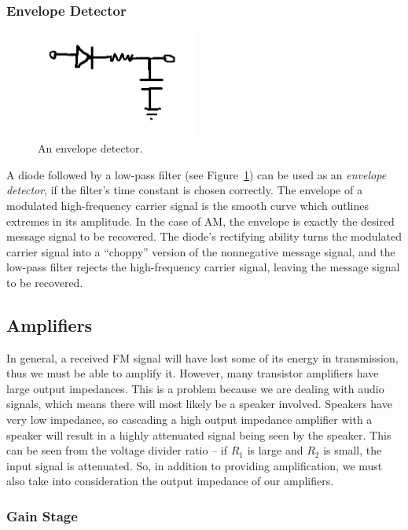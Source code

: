 \documentclass[11pt]{article}
\begin{document}
        \subsubsection{Envelope Detector}

        \begin{figure}[H]
            \centering
                \includegraphics[width = 200px]{env_det.png}
            \caption{An envelope detector.}
            \label{envdet}
        \end{figure}

        \noindent A diode followed by a low-pass filter (see Figure~\ref{envdet}) can be used as an \emph{envelope detector}, if the filter's time constant is chosen correctly. The envelope of a modulated high-frequency carrier signal is the smooth curve which outlines extremes in its amplitude. In the case of AM, the envelope is exactly the desired message signal to be recovered. The diode's rectifying ability turns the modulated carrier signal into a ``choppy'' version of the nonnegative message signal, and the low-pass filter rejects the high-frequency carrier signal, leaving the message signal to be recovered.

    \subsection{Amplifiers}
    In general, a received FM signal will have lost some of its energy in transmission, thus we must be able to amplify it. However, many transistor amplifiers have large output impedances. This is a problem because we are dealing with audio signals, which means there will most likely be a speaker involved. Speakers have very low impedance, so cascading a high output impedance amplifier with a speaker will result in a highly attenuated signal being seen by the speaker. This can be seen from the voltage divider ratio -- if $R_1$ is large and $R_2$ is small, the input signal is attenuated. So, in addition to providing amplification, we must also take into consideration the output impedance of our amplifiers.

        \subsubsection{Gain Stage}
        
\end{document}

